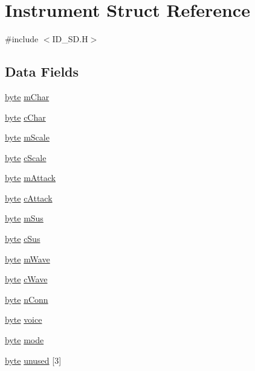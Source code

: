 \hypertarget{structInstrument}{
\section{Instrument Struct Reference}
\label{structInstrument}
}


{\ttfamily \#include $<$ID\_\-SD.H$>$}

\subsection*{Data Fields}
\begin{DoxyCompactItemize}
\item 
\hyperlink{ID__HEAD_8H_a0c8186d9b9b7880309c27230bbb5e69d}{byte} \hyperlink{structInstrument_a83b6ae2f7ce5b1f77e694894511aa2ba}{mChar}
\item 
\hyperlink{ID__HEAD_8H_a0c8186d9b9b7880309c27230bbb5e69d}{byte} \hyperlink{structInstrument_a1bf1fcd368cf2603466c404bfa232f0f}{cChar}
\item 
\hyperlink{ID__HEAD_8H_a0c8186d9b9b7880309c27230bbb5e69d}{byte} \hyperlink{structInstrument_ac74c7b5fed27a112b991dab54f35af73}{mScale}
\item 
\hyperlink{ID__HEAD_8H_a0c8186d9b9b7880309c27230bbb5e69d}{byte} \hyperlink{structInstrument_aa2146949db968b30fd01f6baf753d809}{cScale}
\item 
\hyperlink{ID__HEAD_8H_a0c8186d9b9b7880309c27230bbb5e69d}{byte} \hyperlink{structInstrument_a10c5421dcbea95e6ac4886dce2fc3866}{mAttack}
\item 
\hyperlink{ID__HEAD_8H_a0c8186d9b9b7880309c27230bbb5e69d}{byte} \hyperlink{structInstrument_a47316537cb695ab0077a18adf3d3fece}{cAttack}
\item 
\hyperlink{ID__HEAD_8H_a0c8186d9b9b7880309c27230bbb5e69d}{byte} \hyperlink{structInstrument_a76c41b497e0f1db25b0db6160ccb24ee}{mSus}
\item 
\hyperlink{ID__HEAD_8H_a0c8186d9b9b7880309c27230bbb5e69d}{byte} \hyperlink{structInstrument_aa407c7003d3855af442e3e317eb84ea5}{cSus}
\item 
\hyperlink{ID__HEAD_8H_a0c8186d9b9b7880309c27230bbb5e69d}{byte} \hyperlink{structInstrument_a20877bc696a17547f44cb78efcfff635}{mWave}
\item 
\hyperlink{ID__HEAD_8H_a0c8186d9b9b7880309c27230bbb5e69d}{byte} \hyperlink{structInstrument_a493da8d8225091ad69aadfbe26971979}{cWave}
\item 
\hyperlink{ID__HEAD_8H_a0c8186d9b9b7880309c27230bbb5e69d}{byte} \hyperlink{structInstrument_a40e28df7a44faa1e42a800cd50ff52ab}{nConn}
\item 
\hyperlink{ID__HEAD_8H_a0c8186d9b9b7880309c27230bbb5e69d}{byte} \hyperlink{structInstrument_a47a6c9bb66ac68faf34e32a9f08de94b}{voice}
\item 
\hyperlink{ID__HEAD_8H_a0c8186d9b9b7880309c27230bbb5e69d}{byte} \hyperlink{structInstrument_a0ae3a416220b0687eecb443f6856a2fd}{mode}
\item 
\hyperlink{ID__HEAD_8H_a0c8186d9b9b7880309c27230bbb5e69d}{byte} \hyperlink{structInstrument_a40bcda7399dcc7bb80e4a543c80680d9}{unused} \mbox{[}3\mbox{]}
\end{DoxyCompactItemize}


